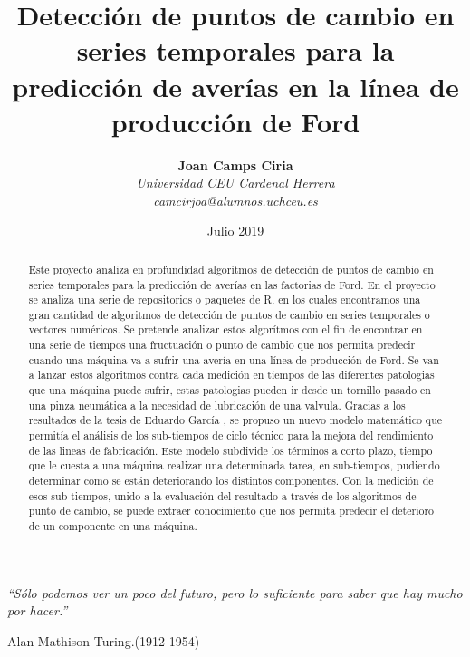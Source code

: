 \documentclass[runningheads,a4paper,12pt]{report}
\begin{document}
\title{\textbf{Detección de puntos de cambio en series temporales para la predicción de averías en la línea de
producción de Ford}}

\author{
\textbf{Joan Camps Ciria}\\
\textit{Universidad CEU Cardenal Herrera}\\
\textit{camcirjoa@alumnos.uchceu.es}
}
\date{Julio 2019}

\maketitle

\pagestyle{empty}

\vspace*{\fill}

\begin{center}
\small	\textit{\textquotedblleft Sólo podemos ver un poco del futuro, pero lo suficiente para saber que hay mucho por hacer.\textquotedblright}
\end{center}
\begin{flushright}	
Alan Mathison Turing.(1912-1954)
\end{flushright}


\vspace*{\fill}
\newpage






\begin{abstract}
Este proyecto analiza en profundidad algorítmos de detección de puntos de cambio en series temporales para la predicción de averías en las factorias de Ford. En el proyecto se analiza una serie de repositorios o paquetes de R, en los cuales encontramos una gran cantidad de algoritmos de detección de puntos de cambio en series temporales o vectores numéricos. Se pretende analizar estos algorítmos con el fin de encontrar en una serie de tiempos una fructuación o punto de cambio que nos permita predecir cuando una máquina va a sufrir una avería en una línea de producción de Ford. Se van a lanzar estos algoritmos contra cada medición en tiempos de las diferentes patologias que una máquina puede sufrir, estas patologias pueden ir desde un tornillo pasado en una pinza neumática a la necesidad de lubricación de una valvula. Gracias a los resultados de la tesis de Eduardo García \cite{tesis}, se propuso un nuevo modelo matemático que permitía el análisis de los sub-tiempos de ciclo técnico para la mejora del rendimiento de las lineas de fabricación. Este modelo subdivide los términos a corto plazo, tiempo que le cuesta a una máquina realizar una determinada tarea, en sub-tiempos, pudiendo determinar como se están deteriorando los distintos componentes. Con la medición de esos sub-tiempos, unido a la evaluación del resultado a través de los algoritmos de punto de cambio, se puede extraer conocimiento que nos permita predecir el deterioro de un componente en una máquina.



\end{abstract}
\pagebreak
\end{document}
